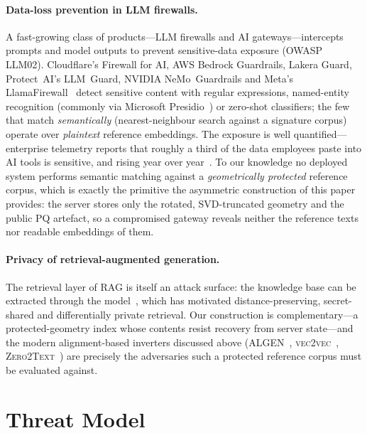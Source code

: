 \documentclass[11pt,a4paper]{article}
\begin{document}
\paragraph{Data-loss prevention in LLM firewalls.} A fast-growing class
of products---LLM firewalls and AI gateways---intercepts prompts and model
outputs to prevent sensitive-data exposure (OWASP LLM02). Cloudflare's
Firewall for AI, AWS Bedrock Guardrails, Lakera Guard, Protect~AI's
LLM~Guard, NVIDIA NeMo~Guardrails and Meta's
LlamaFirewall~\cite{ref_llamafirewall} detect sensitive content with
regular expressions, named-entity recognition (commonly via Microsoft
Presidio~\cite{ref_presidio}) or zero-shot classifiers; the few that match
\emph{semantically} (nearest-neighbour search against a signature corpus)
operate over \emph{plaintext} reference embeddings. The exposure is well
quantified---enterprise telemetry reports that roughly a third of the data
employees paste into AI tools is sensitive, and rising year over
year~\cite{ref_cyberhaven}. To our knowledge no deployed system performs
semantic matching against a \emph{geometrically protected} reference
corpus, which is exactly the primitive the asymmetric construction of this
paper provides: the server stores only the rotated, SVD-truncated geometry
and the public PQ artefact, so a compromised gateway reveals neither the
reference texts nor readable embeddings of them.

\paragraph{Privacy of retrieval-augmented generation.} The retrieval layer
of RAG is itself an attack surface: the knowledge base can be extracted
through the model~\cite{ref_zeng_rag}, which has motivated
distance-preserving, secret-shared and differentially private retrieval.
Our construction is complementary---a protected-geometry index whose
contents resist recovery from server state---and the modern alignment-based
inverters discussed above (\textsc{ALGEN}~\cite{ref_algen},
\textsc{vec2vec}~\cite{ref_vec2vec}, \textsc{Zero2Text}~\cite{ref_zero2text})
are precisely the adversaries such a protected reference corpus must be
evaluated against.

\section{Threat Model}\label{sec:threat}
\end{document}
